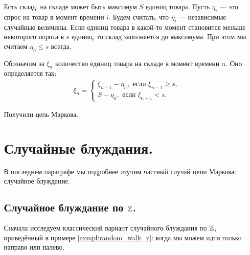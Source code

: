 \documentclass[../main.tex]{subfiles}
\begin{document}
\begin{exmpl}
 Есть склад, на складе может быть максимум $ S $ единиц товара. Пусть $ \eta_i $ --- это спрос на товар в момент времени $ i $. Будем считать, что $ \eta_i $ --- независимые случайные величины. Если единиц товара в какой-то момент становится меньше некоторого порога в $ s $ единиц, то склад заполняется до максимума. При этом мы считаем $ \eta_n \leqslant s $ всегда.

 Обозначим за $ \xi_n $ количество единиц товара на складе в момент времени $ n $. Оно определяется так:
 \begin{align*}
  \xi_n = \begin{cases}
   \xi_{n-1} - \eta_n, \text{ если }  \xi_{n-1} \geqslant s, \\
   S - \eta_n, \text{ если } \xi_{n-1} < s.
  \end{cases}
 \end{align*}

 Получили цепь Маркова.
\end{exmpl}

\newpage
\section{Случайные блуждания.}

В последнем параграфе мы подробнее изучим частный случай цепи Маркова: случайное блуждание.

\subsection{Случайное блуждание по \texorpdfstring{$\mathbb{Z}$}{целой прямой}.}

Сначала исследуем классический вариант случайного блуждания по $ \mathbb{Z} $, приведённый в примере \ref{exmpl:random_walk_z}: когда мы можем идти только направо или налево.
\end{document}

